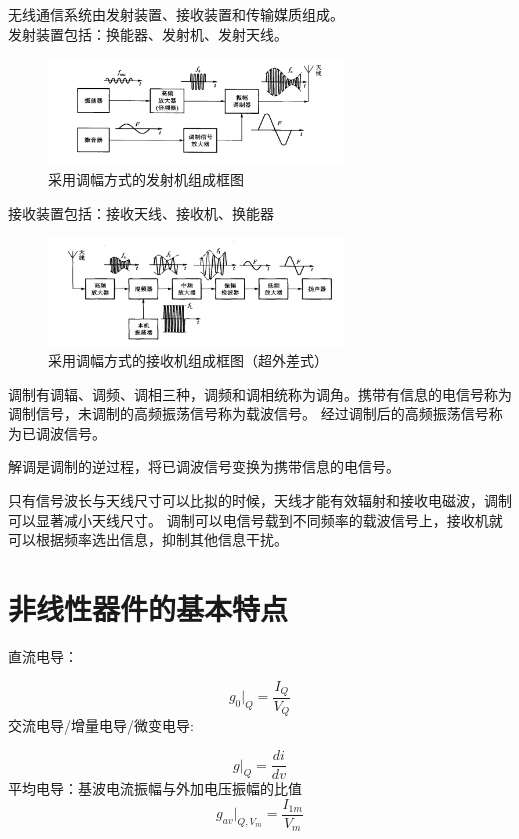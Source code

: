 \documentclass[10pt]{article}
\begin{document}
   \par
   无线通信系统由发射装置、接收装置和传输媒质组成。\\
   发射装置包括：换能器、发射机、发射天线。
   \begin{figure}[H] %
    \centering %
    \includegraphics[width=0.7\textwidth]{pictures/1-1.png} %
    \caption{采用调幅方式的发射机组成框图} %
    \label{fig.1-1} %
    \end{figure}
   接收装置包括：接收天线、接收机、换能器
   \begin{figure}[H] %
    \centering %
    \includegraphics[width=0.7\textwidth]{pictures/1-2.png} %
    \caption{采用调幅方式的接收机组成框图（超外差式）} %
    \label{fig.1-1} %
    \end{figure}
    调制有调辐、调频、调相三种，调频和调相统称为调角。携带有信息的电信号称为调制信号，未调制的高频振荡信号称为载波信号。
    经过调制后的高频振荡信号称为已调波信号。\par
    解调是调制的逆过程，将已调波信号变换为携带信息的电信号。\par
    只有信号波长与天线尺寸可以比拟的时候，天线才能有效辐射和接收电磁波，调制可以显著减小天线尺寸。
    调制可以电信号载到不同频率的载波信号上，接收机就可以根据频率选出信息，抑制其他信息干扰。
\section{非线性器件的基本特点}
    直流电导：\par
    $$
    g_0 |_Q = \frac{I_Q}{V_Q}
    $$
    交流电导/增量电导/微变电导:\par
    $$
    g|_Q = \frac{di}{dv}
    $$
    平均电导：基波电流振幅与外加电压振幅的比值
    $$
    g_{av}|_{Q,V_m} = \frac{I_{1m}}{V_m}
    $$
\end{document}
